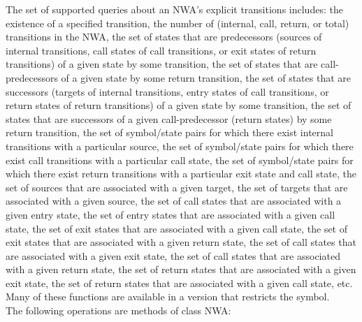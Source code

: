 \documentclass{llncs}
\begin{document}
The set of supported queries about an NWA's explicit transitions includes:
the existence of a specified transition, the number of (internal, call,
return, or total) transitions in the NWA, the set of states that are
predecessors (sources of internal transitions, call states of call
transitions, or exit states of return transitions) of a given state by some
transition, the set of states that are call-predecessors of a given state by
some return transition, the set of states that are successors (targets of
internal transitions, entry states of call transitions, or return states of
return transitions) of a given state by some transition, the set of states
that are successors of a given call-predecessor (return states) by some
return transition, the set of symbol/state pairs for which there exist
internal transitions with a particular source, the set of symbol/state pairs
for which there exist call transitions with a particular call state, the set
of symbol/state pairs for which there exist return transitions with a
particular exit state and call state, the set of sources that are associated
with a given target, the set of targets that are associated with a given
source, the set of call states that are associated with a given entry state,
the set of entry states that are associated with a given call state, the set
of exit states that are associated with a given call state, the set of exit
states that are associated with a given return state, the set of call states
that are associated with a given exit state, the set of call states that are
associated with a given return state, the set of return states that are
associated with a given exit state, the set of return states that are
associated with a given call state, etc.  Many of these functions are
available in a version that restricts the symbol. \\

\noindent The following operations are methods of class NWA:
\end{document}
